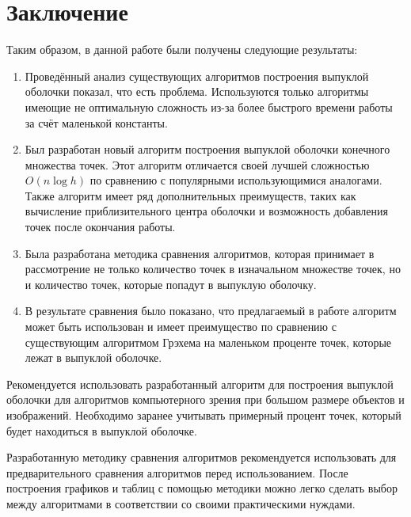 \chapter*{Заключение}						%


Таким образом, в данной работе были получены следующие результаты:
\begin{enumerate}
	\item Проведённый анализ существующих алгоритмов построения выпуклой оболочки показал, что есть проблема. Используются только алгоритмы имеющие не оптимальную сложность из-за более быстрого времени работы за счёт маленькой константы.
	\item Был разработан новый алгоритм построения выпуклой оболочки конечного множества точек. Этот алгоритм отличается своей лучшей сложностью $O(n \log h)$ по сравнению с популярными использующимися аналогами. Также алгоритм имеет ряд дополнительных преимуществ, таких как вычисление приблизительного центра оболочки и возможность добавления точек после окончания работы.
	\item Была разработана методика сравнения алгоритмов, которая принимает в рассмотрение не только количество точек в изначальном множестве точек, но и количество точек, которые попадут в выпуклую оболочку.
	\item В результате сравнения было показано, что предлагаемый в работе алгоритм может быть использован и имеет преимущество по сравнению с существующим алгоритмом Грэхема на маленьком проценте точек, которые лежат в выпуклой оболочке.
\end{enumerate}

Рекомендуется использовать разработанный алгоритм для построения выпуклой оболочки для алгоритмов компьютерного зрения при большом размере объектов и изображений. Необходимо заранее учитывать примерный процент точек, который будет находиться в выпуклой оболочке.

Разработанную методику сравнения алгоритмов рекомендуется использовать для предварительного сравнения алгоритмов перед использованием. После построения графиков и таблиц с помощью методики можно легко сделать выбор между алгоритмами в соответствии со своими практическими нуждами.

